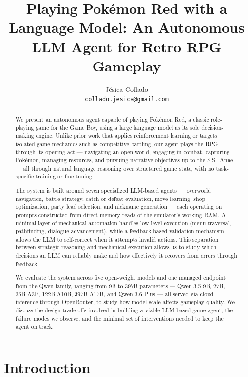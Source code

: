 \documentclass{article}
\title{Playing Pok\'{e}mon Red with a Language Model: An Autonomous LLM Agent for Retro RPG Gameplay}
\author{
  J\'{e}sica Collado \\
  \texttt{collado.jesica@gmail.com}
}
\date{}
\begin{document}
\maketitle

\begin{abstract}
We present an autonomous agent capable of playing Pok\'{e}mon Red, a classic role-playing game for the Game Boy, using a large language model as its sole decision-making engine. Unlike prior work that applies reinforcement learning or targets isolated game mechanics such as competitive battling, our agent plays the RPG through its opening act --- navigating an open world, engaging in combat, capturing Pok\'{e}mon, managing resources, and pursuing narrative objectives up to the S.S.\ Anne --- all through natural language reasoning over structured game state, with no task-specific training or fine-tuning.

The system is built around seven specialized LLM-based agents --- overworld navigation, battle strategy, catch-or-defeat evaluation, move learning, shop optimization, party lead selection, and nickname generation --- each operating on prompts constructed from direct memory reads of the emulator's working RAM. A minimal layer of mechanical automation handles low-level execution (menu traversal, pathfinding, dialogue advancement), while a feedback-based validation mechanism allows the LLM to self-correct when it attempts invalid actions. This separation between strategic reasoning and mechanical execution allows us to study which decisions an LLM can reliably make and how effectively it recovers from errors through feedback.

We evaluate the system across five open-weight models and one managed endpoint from the Qwen family, ranging from 9B to 397B parameters --- Qwen 3.5 9B, 27B, 35B-A3B, 122B-A10B, 397B-A17B, and Qwen 3.6 Plus --- all served via cloud inference through OpenRouter, to study how model scale affects gameplay quality. We discuss the design trade-offs involved in building a viable LLM-based game agent, the failure modes we observe, and the minimal set of interventions needed to keep the agent on track.
\end{abstract}


\section{Introduction}
\label{sec:introduction}
\end{document}
